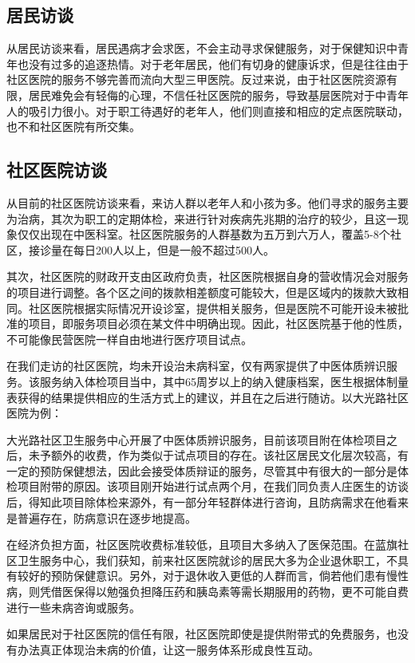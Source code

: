 \documentclass{article}
\begin{document}
    \subsection{居民访谈}
    从居民访谈来看，居民遇病才会求医，不会主动寻求保健服务，对于保健知识中青年也没有过多的追逐热情。对于老年居民，他们有切身的健康诉求，但是往往由于社区医院的服务不够完善而流向大型三甲医院。反过来说，由于社区医院资源有限，居民难免会有轻侮的心理，不信任社区医院的服务，导致基层医院对于中青年人的吸引力很小。对于职工待遇好的老年人，他们则直接和相应的定点医院联动，也不和社区医院有所交集。
   
    \subsection{社区医院访谈}
    从目前的社区医院访谈来看，来访人群以老年人和小孩为多。他们寻求的服务主要为治病，其次为职工的定期体检，来进行针对疾病先兆期的治疗的较少，且这一现象仅仅出现在中医科室。社区医院服务的人群基数为五万到六万人，覆盖5-8个社区，接诊量在每日200人以上，但是一般不超过500人。
    
    其次，社区医院的财政开支由区政府负责，社区医院根据自身的营收情况会对服务的项目进行调整。各个区之间的拨款相差额度可能较大，但是区域内的拨款大致相同。社区医院根据实际情况开设诊室，提供相关服务，但是医院不可能开设未被批准的项目，即服务项目必须在某文件中明确出现。因此，社区医院基于他的性质，不可能像民营医院一样自由地进行医疗项目试点。
    
    在我们走访的社区医院，均未开设治未病科室，仅有两家提供了中医体质辨识服务。该服务纳入体检项目当中，其中65周岁以上的纳入健康档案，医生根据体制量表获得的结果提供相应的生活方式上的建议，并且在之后进行随访。以大光路社区医院为例：
    
    大光路社区卫生服务中心开展了中医体质辨识服务，目前该项目附在体检项目之后，未予额外的收费，作为类似于试点项目的存在。该社区居民文化层次较高，有一定的预防保健想法，因此会接受体质辩证的服务，尽管其中有很大的一部分是体检项目附带的原因。该项目刚开始进行试点两个月，在我们同负责人庄医生的访谈后，得知此项目除体检来源外，有一部分年轻群体进行咨询，且防病需求在他看来是普遍存在，防病意识在逐步地提高。
    
    在经济负担方面，社区医院收费标准较低，且项目大多纳入了医保范围。在蓝旗社区卫生服务中心，我们获知，前来社区医院就诊的居民大多为企业退休职工，不具有较好的预防保健意识。另外，对于退休收入更低的人群而言，倘若他们患有慢性病，则凭借医保得以勉强负担降压药和胰岛素等需长期服用的药物，更不可能自费进行一些未病咨询或服务。
    
    如果居民对于社区医院的信任有限，社区医院即使是提供附带式的免费服务，也没有办法真正体现治未病的价值，让这一服务体系形成良性互动。
    
\end{document}
